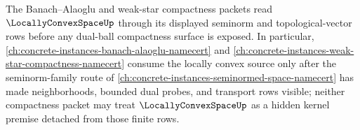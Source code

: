The Banach--Alaoglu and weak-star compactness packets read $\LocallyConvexSpaceUp$ through its displayed seminorm and topological-vector rows before any dual-ball compactness surface is exposed. In particular, \autoref{ch:concrete-instances-banach-alaoglu-namecert} and \autoref{ch:concrete-instances-weak-star-compactness-namecert} consume the locally convex source only after the seminorm-family route of \autoref{ch:concrete-instances-seminormed-space-namecert} has made neighborhoods, bounded dual probes, and transport rows visible; neither compactness packet may treat $\LocallyConvexSpaceUp$ as a hidden kernel premise detached from those finite rows.

